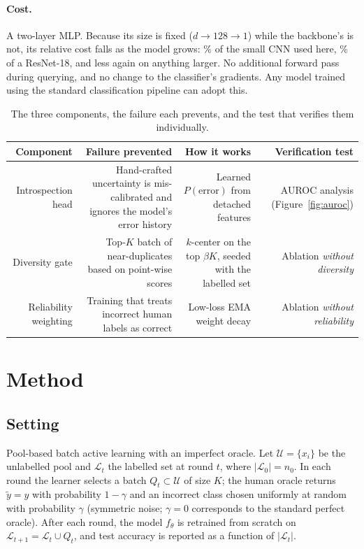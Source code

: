 \documentclass[a4paper,fleqn,longmktitle]{cas-sc}
\begin{document}
\paragraph{Cost.} A two-layer MLP. Because its size is fixed
($d\to128\to1$) while the backbone's is not, its relative cost falls as
the model grows: \FmnistHeadPct\% of the small CNN used here,
\CifarHeadPct\% of a ResNet-18, and less again on anything larger. No
additional forward pass during querying, and no change to the
classifier's gradients. Any model trained using the standard
classification pipeline can adopt this.

\begin{table}[pos=htbp]
\centering\small
\caption{The three components, the failure each prevents, and the test
that verifies them individually.}
\label{tab:components}
\begin{tabular}{R{0.21}R{0.29}R{0.22}R{0.16}}
\toprule
Component & Failure prevented & How it works & Verification test \\
\midrule
Introspection head & Hand-crafted uncertainty is mis-calibrated and
ignores the model's error history & Learned $P(\text{error})$ from
detached features & AUROC analysis (Figure~\ref{fig:auroc}) \\
Diversity gate & Top-$K$ batch of near-duplicates based on point-wise
scores & $k$-center on the top $\beta K$, seeded with the labelled set
& Ablation \emph{without diversity} \\
Reliability weighting & Training that treats incorrect human labels as
correct & Low-loss EMA weight decay & Ablation \emph{without
reliability} \\
\bottomrule
\end{tabular}
\end{table}

\section{Method}\label{sec:method}
\subsection{Setting}
Pool-based batch active learning with an imperfect oracle. Let
$\mathcal{U}=\{x_i\}$ be the unlabelled pool and $\mathcal{L}_t$ the
labelled set at round $t$, where $|\mathcal{L}_0|=n_0$. In each round
the learner selects a batch $Q_t\subset\mathcal{U}$ of size $K$; the
human oracle returns $\tilde{y}=y$ with probability $1-\gamma$ and an
incorrect class chosen uniformly at random with probability $\gamma$
(symmetric noise; $\gamma=0$ corresponds to the standard perfect
oracle). After each round, the model $f_\theta$ is retrained from
scratch on $\mathcal{L}_{t+1}=\mathcal{L}_t\cup Q_t$, and test accuracy
is reported as a function of $|\mathcal{L}_t|$.
\end{document}
